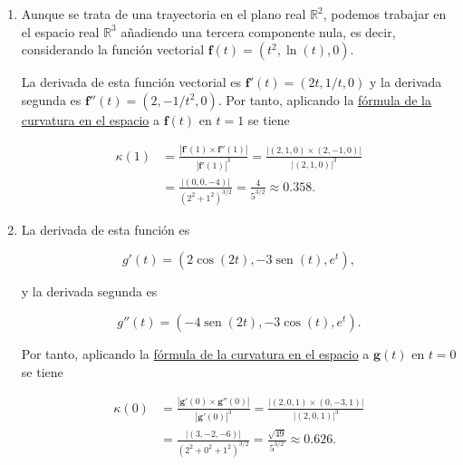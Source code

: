 \documentclass[
  a4paper,
]{scrreport}
\theoremstyle{definition}
\theoremstyle{remark}
\begin{document}
\begin{tcolorbox}[enhanced jigsaw, left=2mm, coltitle=black, colbacktitle=quarto-callout-tip-color!10!white, opacitybacktitle=0.6, colback=white, breakable, titlerule=0mm, toptitle=1mm, rightrule=.15mm, bottomtitle=1mm, bottomrule=.15mm, toprule=.15mm, leftrule=.75mm, arc=.35mm, opacityback=0, title=\textcolor{quarto-callout-tip-color}{\faLightbulb}\hspace{0.5em}{Solución}, colframe=quarto-callout-tip-color-frame]

\begin{enumerate}
\def\labelenumi{\alph{enumi}.}
\item
  Aunque se trata de una trayectoria en el plano real \(\mathbb{R}^2\),
  podemos trabajar en el espacio real \(\mathbb{R}^3\) añadiendo una
  tercera componente nula, es decir, considerando la función vectorial
  \(\mathbf{f}(t) = (t^2, \ln(t), 0)\).

  La derivada de esta función vectorial es
  \(\mathbf{f}'(t) = (2t, 1/t, 0)\) y la derivada segunda es
  \(\mathbf{f}''(t) = (2, -1/t^2, 0)\). Por tanto, aplicando la
  \href{https://aprendeconalf.es/analisis-manual/12-funciones-vectoriales.html\#thm-curvatura-trayectoria-espacio-real}{fórmula
  de la curvatura en el espacio} a \(\mathbf{f}(t)\) en \(t=1\) se tiene

  \begin{align*}
  \kappa(1) &= 
  \frac{|\mathbf{f}'(1)\times \mathbf{f}''(1)|}{|\mathbf{f}'(1)|^3}
  = \frac{|(2,1,0)\times (2,-1,0)|}{|(2,1,0)|^3} \\
  & = \frac{|(0,0,-4)|}{(2^2+1^2)^{3/2}} 
  = \frac{4}{5^{3/2}} 
  \approx 0.358.
  \end{align*}
\item
  La derivada de esta función es

  \[
  g'(t) = (2\cos(2t), -3\operatorname{sen}(t), e^t),
  \]

  y la derivada segunda es

  \[
  g''(t) = (-4\operatorname{sen}(2t), -3\cos(t), e^t).
  \]

  Por tanto, aplicando la
  \href{https://aprendeconalf.es/analisis-manual/12-funciones-vectoriales.html\#thm-curvatura-trayectoria-espacio-real}{fórmula
  de la curvatura en el espacio} a \(\mathbf{g}(t)\) en \(t=0\) se tiene

  \begin{align*}
  \kappa(0) 
  &= \frac{|\mathbf{g}'(0)\times \mathbf{g}''(0)|}{|\mathbf{g}'(0)|^3} 
  = \frac{|(2,0,1)\times (0,-3,1)|}{|(2,0,1)|^3} \\
  &= \frac{|(3,-2,-6)|}{(2^2+0^2+1^2)^{3/2}}
  = \frac{\sqrt{49}}{5^{3/2}}
  \approx 0.626.
  \end{align*}
\end{enumerate}

\end{tcolorbox}
\end{document}
